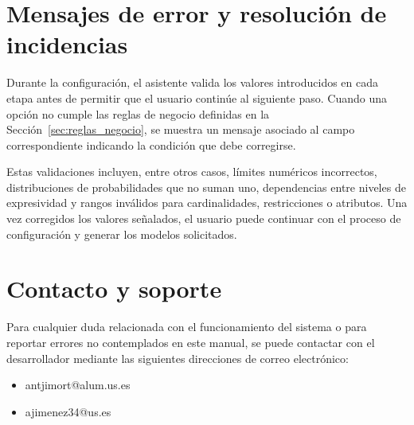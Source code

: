 \section{Mensajes de error y resolución de incidencias}
\label{sec:errores}



Durante la configuración, el asistente valida los valores introducidos en cada
etapa antes de permitir que el usuario continúe al siguiente paso. Cuando una
opción no cumple las reglas de negocio definidas en la
Sección~\ref{sec:reglas_negocio}, se muestra un mensaje asociado al campo
correspondiente indicando la condición que debe corregirse.

Estas validaciones incluyen, entre otros casos, límites numéricos incorrectos,
distribuciones de probabilidades que no suman uno, dependencias entre niveles de
expresividad y rangos inválidos para cardinalidades, restricciones o atributos.
Una vez corregidos los valores señalados, el usuario puede continuar con el
proceso de configuración y generar los modelos solicitados.


\section{Contacto y soporte}
\label{sec:contacto}


Para cualquier duda relacionada con el funcionamiento del sistema o para
reportar errores no contemplados en este manual, se puede contactar con el
desarrollador mediante las siguientes direcciones de correo electrónico:

\begin{itemize}
    \item antjimort@alum.us.es
    \item ajimenez34@us.es
\end{itemize}